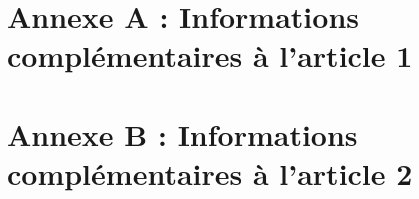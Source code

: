 \documentclass[a4paper,12pt]{book}
\numberwithin{equation}{chapter}
\numberwithin{figure}{chapter}
\numberwithin{table}{chapter}
\begin{document}


\backmatter
\singlespacing




\begin{appendices}
\chapter{Annexe A : Informations complémentaires à l'article 1}

\chapter{Annexe B : Informations complémentaires à l'article 2}

\end{appendices}
\end{document}
